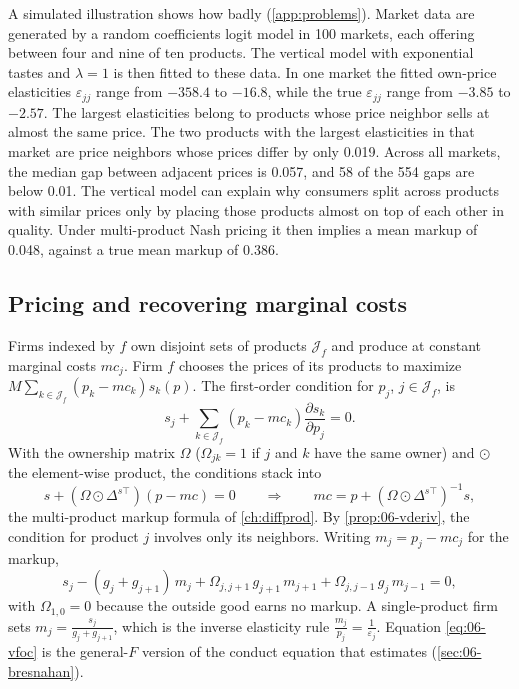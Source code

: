 A simulated illustration shows how badly (\cref{app:problems}). Market data are generated by a random
coefficients logit model in 100 markets, each offering between four and nine of ten products. The vertical
model with exponential tastes and $\lambda = 1$ is then fitted to these data. In one market the fitted own-price
elasticities $\varepsilon_{jj}$ range from $-358.4$ to $-16.8$, while the true $\varepsilon_{jj}$ range from $-3.85$
to $-2.57$. The largest
elasticities belong to products whose price neighbor sells at almost the same price. The two products with the
largest elasticities in that market are price neighbors whose prices differ by only 0.019. Across all markets, the median gap between
adjacent prices is 0.057, and 58 of the 554 gaps are below 0.01. The vertical model can explain why
consumers split across products with similar prices only by placing those products almost on top of each
other in quality. Under multi-product Nash pricing it then implies a mean markup of 0.048, against a true
mean markup of 0.386.

\subsection{Pricing and recovering marginal costs}\label{sec:06-vpricing}

Firms indexed by $f$ own disjoint sets of products $\mathcal J_f$ and produce at constant marginal costs
$mc_j$. Firm
$f$ chooses the prices of its products to maximize $M\sum_{k \in \mathcal J_f}(p_k - mc_k)s_k(p)$. The
first-order condition for $p_j$, $j \in \mathcal J_f$, is
\begin{equation*}
  s_j + \sum_{k \in \mathcal J_f}(p_k - mc_k)\frac{\partial s_k}{\partial p_j} = 0 .
\end{equation*}
With the ownership matrix $\Omega$ ($\Omega_{jk} = 1$ if $j$ and $k$ have the same owner) and $\odot$ the
element-wise product, the conditions stack into
\begin{equation}\label{eq:06-vfoc-matrix}
  s + (\Omega \odot \Delta^{s\top})(p - mc) = 0
  \qquad\Longrightarrow\qquad
  mc = p + (\Omega \odot \Delta^{s\top})^{-1}s ,
\end{equation}
the multi-product markup formula of \cref{ch:diffprod}. By \cref{prop:06-vderiv}, the condition for product
$j$ involves only its neighbors. Writing $m_j = p_j - mc_j$ for the markup,
\begin{equation}\label{eq:06-vfoc}
  s_j - (g_j + g_{j+1})\,m_j + \Omega_{j,j+1}\,g_{j+1}\,m_{j+1} + \Omega_{j,j-1}\,g_j\,m_{j-1} = 0,
\end{equation}
with $\Omega_{1,0} = 0$ because the outside good earns no markup. A single-product firm sets
$m_j = \frac{s_j}{g_j + g_{j+1}}$, which is the inverse elasticity rule $\frac{m_j}{p_j} = \frac{1}{\varepsilon_j}$.
Equation \eqref{eq:06-vfoc} is the general-$F$ version of the conduct equation that \citet{Bresnahan1987}
estimates (\cref{sec:06-bresnahan}).

